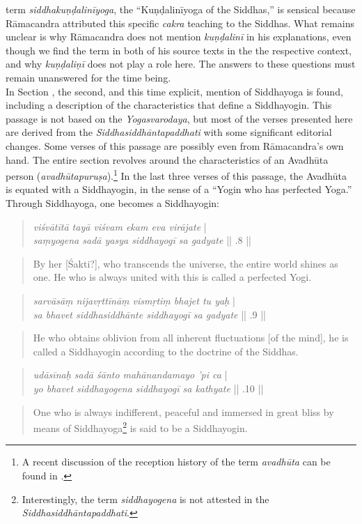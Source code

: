 term \textit{siddhakuṇḍalinīyoga}, the ``Kuṇḍalinīyoga of the Siddhas,'' is sensical because Rāmacandra attributed this specific \textit{cakra} teaching to the Siddhas. What remains unclear is why Rāmacandra does not mention \textit{kuṇḍalinī} in his explanations, even though we find the term in both of his source texts in the the respective context, and why \textit{kuṇḍaliṇī} does not play a role here. The answers to these questions must remain unanswered for the time being.\\  

In Section , the second, and this time explicit, mention of Siddhayoga is found, including a description of the characteristics that define a Siddhayogin. This passage is not based on the \textit{Yogasvarodaya}, but most of the verses presented here are derived from the \textit{Siddhasiddhāntapaddhati} with some significant editorial changes. Some verses of this passage are possibly even from Rāmacandra's own hand. The entire section revolves around the characteristics of an Avadhūta person (\textit{avadhūtapuruṣa}).\footnote{A recent discussion of the reception history of the term \textit{avadhūta} can be found in \cite{pudi2023}.} In the last three verses of this passage, the Avadhūta is equated with a Siddhayogin, in the sense of a ``Yogin who has perfected Yoga.'' Through Siddhayoga, one becomes a Siddhayogin:

\begin{quote}
  \textit{viśvātītā tayā viśvam ekam eva virājate} |\\
  \textit{saṃyogena sadā yasya siddhayogī sa gadyate} || .8 ||
\end{quote}
\begin{quote}
  By her [Śakti?], who transcends the universe, the entire world shines as one. He who is always united with this is called a perfected Yogi. 
\end{quote}
\begin{quote}
  \textit{sarvāsāṃ nijavṛttīnāṃ vismṛtiṃ bhajet tu yaḥ} |\\
  \textit{sa bhavet siddhasiddhānte siddhayogī sa gadyate} || .9 ||
\end{quote}
\begin{quote}
  He who obtains oblivion from all inherent fluctuations [of the mind], he is called a Siddhayogin according to the doctrine of the Siddhas.
\end{quote}
  \begin{quote}
  \textit{udāsīnaḥ sadā śānto mahānandamayo 'pi ca} |\\
  \textit{yo bhavet siddhayogena siddhayogī sa kathyate} || .10 ||
\end{quote}
\begin{quote}
One who is always indifferent, peaceful and immersed in great bliss by means of Siddhayoga\footnote{Interestingly, the term \textit{siddhayogena} is not attested in the \textit{Siddhasiddhāntapaddhati}.} is said to be a Siddhayogin.
\end{quote}

